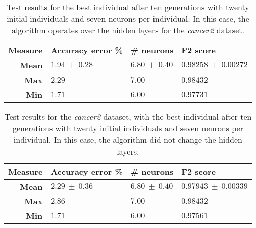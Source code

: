 \documentclass[runningheads]{llncs}
\begin{document}
 \begin{table}
     \centering
     \caption{
Test results for the best individual after ten generations with twenty initial
individuals and seven neurons per individual. In this case, the algorithm
operates over the hidden layers for the \emph{cancer2} dataset.
     }
     \label{tab:fixed-7-1-noconst-can2}
     \begin{tabular}{rlll}
         \textbf{Measure}   & \textbf{Accuracy error \%} & \textbf{\# neurons} & \textbf{F2 score} \\
         \hline
         \textbf{Mean}      & $1.94\ \pm\ 0.28$ & $6.80\ \pm\ 0.40$  & $0.98258\ \pm\ 0.00272$ \\
         \textbf{Max}       & $2.29$            & $7.00$             & $0.98432$               \\
         \textbf{Min}       & $1.71$            & $6.00$             & $0.97731$               \\
     \end{tabular}
 \end{table}

 \begin{table}
     \centering
     \caption{
Test results for the \emph{cancer2} dataset, with the best individual after ten
generations with twenty initial individuals and seven neurons per individual. In
this case, the algorithm did not change the hidden layers.
     }
     \label{tab:fixed-7-1-const-can2}
     \begin{tabular}{rlll}
         \textbf{Measure}   & \textbf{Accuracy error \%} & \textbf{\# neurons} & \textbf{F2 score} \\
         \hline
         \textbf{Mean}      & $2.29\ \pm\ 0.36$ & $6.80\ \pm\ 0.40$  & $0.97943\ \pm\ 0.00339$ \\
         \textbf{Max}       & $2.86$            & $7.00$             & $0.98432$               \\
         \textbf{Min}       & $1.71$            & $6.00$             & $0.97561$               \\
     \end{tabular}
   \end{table}
\end{document}
